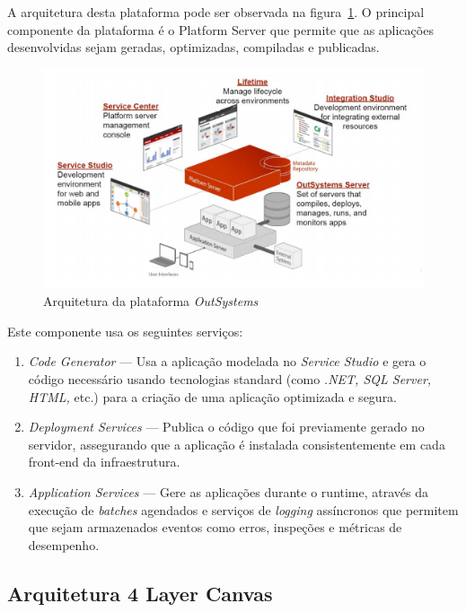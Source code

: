 A arquitetura desta plataforma pode ser observada na figura~\ref{fig:outsystemsArch}. 
O principal componente da plataforma é o Platform Server que permite que as aplicações 
desenvolvidas sejam geradas, optimizadas, compiladas e publicadas. 

\begin{figure}[H]
  \centering
  \includegraphics[]{figures/Architecture.png}
  \caption{Arquitetura da plataforma \textit{OutSystems~\cite{outsystems}}}\label{fig:outsystemsArch}
\end{figure}

Este componente usa os seguintes serviços: 
\begin{enumerate}
  \item \textit{Code Generator} --- Usa a aplicação modelada no \textit{Service Studio} e gera o código necessário usando tecnologias standard (como \textit{.NET, SQL Server, HTML,} etc.) para a criação de uma aplicação optimizada e segura.
  \item \textit{Deployment Services} --- Publica o código que foi previamente gerado no servidor, assegurando que a aplicação é instalada consistentemente em cada front-end da infraestrutura.
  \item \textit{Application Services} --- Gere as aplicações durante o runtime, através da execução de \textit{batches} agendados e serviços de \textit{logging} assíncronos que permitem que sejam armazenados eventos como erros, inspeções e métricas de desempenho.
\end{enumerate}

\newpage

\subsection{Arquitetura 4 Layer Canvas}\label{sec:4lc}

